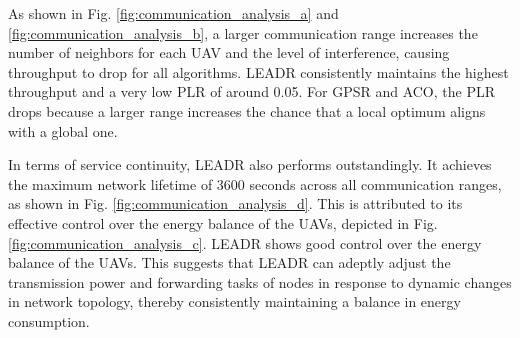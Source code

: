 \documentclass[runningheads]{llncs}
\begin{document}

As shown in Fig. \ref{fig:communication_analysis_a} and \ref{fig:communication_analysis_b}, a larger communication range increases the number of neighbors for each UAV and the level of interference, causing throughput to drop for all algorithms. LEADR consistently maintains the highest throughput and a very low PLR of around 0.05. For GPSR and ACO, the PLR drops because a larger range increases the chance that a local optimum aligns with a global one.

In terms of service continuity, LEADR also performs outstandingly. It achieves the maximum network lifetime of 3600 seconds across all communication ranges, as shown in Fig. \ref{fig:communication_analysis_d}. This is attributed to its effective control over the energy balance of the UAVs, depicted in Fig. \ref{fig:communication_analysis_c}. LEADR shows good control over the energy balance of the UAVs. This suggests that LEADR can adeptly adjust the transmission power and forwarding tasks of nodes in response to dynamic changes in network topology, thereby consistently maintaining a balance in energy consumption.
\end{document}
